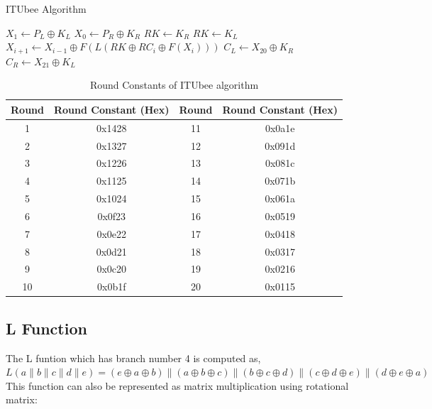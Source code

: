 \documentclass [version=final]{iacrcc}
\begin{document}
\begin{section}{ITUbee Algorithm}
\begin{algorithm}
    \caption{Pseudo code for ITUbee encryption}
    \label{alg:ITUbee}
    \begin{algorithmic}[1]
        \STATE $X_1 \gets P_L \oplus K_L$
        \STATE $X_0 \gets P_R \oplus K_R$
                \STATE $RK \gets K_R$
            \ELSE
                \STATE $RK \gets K_L$
            \ENDIF
            \STATE $X_{i+1} \gets X_{i-1} \oplus F(L(RK \oplus RC_i \oplus F(X_i)))$
            \STATE {}
        \ENDFOR
        \STATE $C_L \gets X_{20} \oplus K_R$
        \STATE $C_R \gets X_{21} \oplus K_L$
    \end{algorithmic}
\end{algorithm}

\begin{table}[H]
    \centering
    \begin{tabular}{|c|c|c|c|}
        \hline
        \textbf{Round} & \textbf{Round Constant (Hex)} & \textbf{Round} & \textbf{Round Constant (Hex)} \\
        \hline
        1  & 0x1428 & 11 & 0x0a1e \\
        2  & 0x1327 & 12 & 0x091d \\
        3  & 0x1226 & 13 & 0x081c \\
        4  & 0x1125 & 14 & 0x071b \\
        5  & 0x1024 & 15 & 0x061a \\
        6  & 0x0f23 & 16 & 0x0519 \\
        7  & 0x0e22 & 17 & 0x0418 \\
        8  & 0x0d21 & 18 & 0x0317 \\
        9  & 0x0c20 & 19 & 0x0216 \\
        10 & 0x0b1f & 20 & 0x0115 \\
        \hline
    \end{tabular}
    \caption{Round Constants of ITUbee algorithm}
    \label{tab:ITUbee_rc}
\end{table}

\subsection{L Function}
The L funtion which has branch number 4 is computed as,\\
$L(a \parallel b \parallel c \parallel d \parallel e) = (e \oplus a \oplus b) \parallel (a \oplus b \oplus c) \parallel (b \oplus c \oplus d) \parallel (c \oplus d \oplus e) \parallel (d \oplus e \oplus a)$
\\This function can also be represented as matrix multiplication using rotational matrix:


\end{section}
\end{document}
